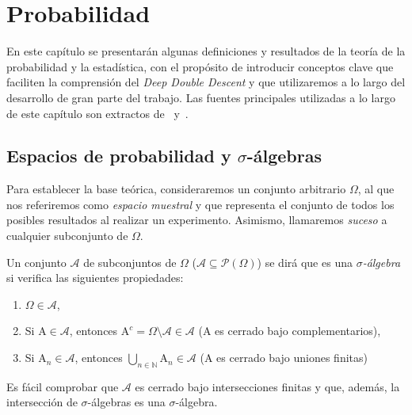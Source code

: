 
\chapter{Probabilidad}\label{ch:capitulo-teoria-de-la-probabilidad}

En este capítulo se presentarán algunas definiciones y resultados de la teoría de la probabilidad y la estadística, con el propósito de introducir conceptos clave que faciliten la comprensión del \textit{Deep Double Descent} y que utilizaremos a lo largo del desarrollo de gran parte del trabajo. Las fuentes principales utilizadas a lo largo de este capítulo son extractos de~\cite{Dembo2014} y~\cite{Knill2009}.\newline

\section{Espacios de probabilidad y $\sigma$-álgebras}

Para establecer la base teórica, consideraremos un conjunto arbitrario $\Omega$, al que nos referiremos como \emph{espacio muestral} y que representa el conjunto de todos los posibles resultados al realizar un experimento. Asimismo, llamaremos \emph{suceso} a cualquier subconjunto de $\Omega$.\newline

\begin{definicion}\label{def:sigma-algebra}
    Un conjunto $\mathcal{A}$ de subconjuntos de $\Omega$ ($\mathcal{A} \subseteq \mathcal{P}(\Omega)$) se dirá que es una \emph{$\sigma$-álgebra} si verifica las siguientes propiedades:

    \begin{enumerate}
        \item $\Omega \in \mathcal{A}$,
        \item Si $\mathrm{A} \in \mathcal{A}$, entonces $\mathrm{A}^c = \Omega \setminus \mathcal{A} \in \mathcal{A}$ ($\mathrm{A}$ es cerrado bajo complementarios),
        \item Si $\mathrm{A}_{n} \in \mathcal{A}$, entonces $\bigcup_{n \in \mathbb{N}} \mathrm{A}_{n} \in \mathcal{A}$ (A es cerrado bajo uniones finitas)
    \end{enumerate}
\end{definicion}

Es fácil comprobar que $\mathcal{A}$ es cerrado bajo intersecciones finitas y que, además, la intersección de $\sigma$-álgebras es una $\sigma$-álgebra.\newline

